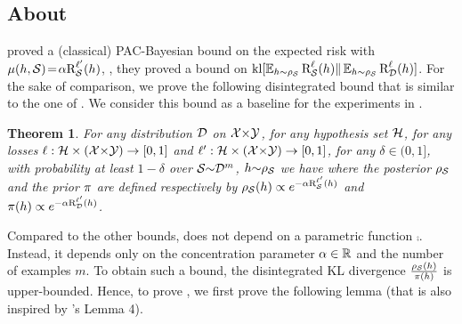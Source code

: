 \documentclass[twoside]{article}
\theoremstyle{plain}
\newtheorem{theorem}{Theorem}
\begin{document}
\subsection[About Equation (8)]{About }
\label{sec:comparison-lever}

\citet[Lemma 5]{lever2013tighter} proved a (classical) PAC-Bayesian bound on the expected risk with $\comp(h,\Scal)\!=\!\alpha\RiskLossp_{\Scal}(h)$, \ie, they proved a bound on $\kl[\EE_{h\sim\AQ}\RiskLoss_{\Scal}(h)\|\EE_{h\sim\AQ}\RiskLoss_{\Dcal}(h)]$.
For the sake of comparison, we prove the following disintegrated bound that is similar to the one of \citet{lever2013tighter}.
We consider this bound as a baseline for the experiments in .

\begin{theorem}
\label{theorem:disintegrated-lever}
For any distribution $\Dcal$ on $\Xcal{\times}\Ycal$, for any hypothesis set $\Hcal$, for any losses $\loss : \Hcal\times(\Xcal{\times}\Ycal) \to [0,1]$ and $\loss' : \Hcal\times(\Xcal{\times}\Ycal) \to [0,1]$, for any $\delta\!\in\!(0,1]$, with probability at least $1{-}\delta$ over $\Scal{\sim}\Dcal^m$, $h{\sim}\AQ$ we have
\eqcomparisonlever
where the posterior $\AQ$ and the prior $\P$ are defined respectively by $\AQ(h) \propto e^{-\alpha\RiskLossp_{\Scal}(h)}$ and $\P(h) \propto e^{-\alpha\RiskLossp_{\Dcal}(h)}$.
\end{theorem}

Compared to the other bounds,  does not depend on a parametric function $\comp$.
Instead, it depends only on the concentration parameter $\alpha\in\R$ and the number of examples $m$.
To obtain such a bound, the disintegrated KL divergence $\frac{\AQ(h)}{\P(h)}$ is upper-bounded. 
Hence, to prove , we first prove the following lemma (that is also inspired by \citeauthor{lever2013tighter}'s Lemma 4).
\end{document}
